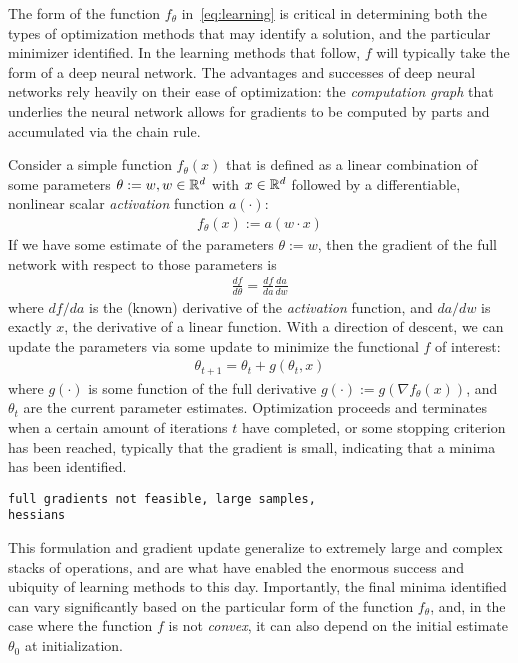 The form of the function $f_\theta$ in~\eqref{eq:learning}
is critical in determining both
the types of optimization methods
that may identify a solution,
and the particular minimizer identified.
In the learning methods that follow,
$f$ will typically take the form of 
a deep neural network.
The advantages
and successes of deep neural networks
rely heavily on their ease of optimization:
the \textit{computation graph} that 
underlies the neural network
allows for gradients
to be computed by parts
and accumulated via the chain rule.

Consider a simple function $f_\theta(x)$
that is defined as a linear combination of 
some parameters $\theta:=w, w\in \mathbb{R}^d$ with $x\in \mathbb{R}^d$ followed by 
a differentiable, nonlinear scalar \textit{activation} function $a(\cdot)$:
\begin{align}
	f_\theta(x) := a(w\cdot x)
\end{align}
If we have some estimate of the parameters $\theta:=w$,
then the gradient of the full network with respect to those parameters is
\begin{align}
	\frac{df}{d\theta} = \frac{df}{da}\frac{da}{dw}
\end{align}
where $df/da$ is the (known) derivative of the \textit{activation} function,
and $da/dw$ is exactly $x$, the derivative of a linear function.
With a direction of descent,
we can update the parameters via some update to minimize the functional $f$ of interest:
\begin{align}
	\theta_{t+1} = \theta_t + g(\theta_t,x)
\end{align}
where $g(\cdot)$ is some function of the full derivative $g(\cdot) := g(\nabla f_\theta(x))$,
and $\theta_t$ are the current parameter estimates.
Optimization proceeds and terminates when a certain amount
of iterations $t$ have completed,
or some stopping criterion has been reached,
typically that the gradient is small,
indicating that a minima has been identified.

\begin{verbatim}
full gradients not feasible, large samples,
hessians
\end{verbatim}



This formulation and gradient update generalize
to extremely large and complex stacks
of operations, and are what have enabled
the enormous success and ubiquity of learning
methods to this day.
Importantly,
the final minima identified can 
vary significantly based on the particular form 
of the function $f_\theta$, and,
in the case where the function $f$ is
not \textit{convex},
it can also depend on
the initial estimate $\theta_0$ at initialization.


